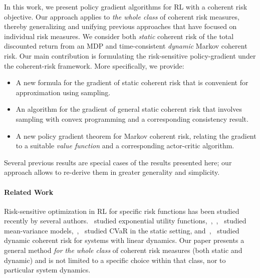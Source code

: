 \documentclass{article} %
\newcommand{\citet}{\cite}
\newcommand{\citep}{\cite}
\begin{document}
In this work, we present policy gradient algorithms for RL with a coherent risk objective. Our approach applies to \emph{the whole class} of coherent risk measures, thereby generalizing and unifying previous approaches that have focused on individual risk measures.  We consider both \emph{static} coherent risk of the total discounted return from an MDP and  time-consistent {\em dynamic} Markov coherent risk.
%
%
Our main contribution is formulating the risk-sensitive policy-gradient under the coherent-risk framework. More specifically, we provide:
\begin{itemize}
\item A new formula for the gradient of static coherent risk that is convenient for approximation using sampling.
\item An algorithm for the gradient of general static coherent risk that involves sampling with convex programming and a corresponding consistency result.
\item A new policy gradient theorem for Markov coherent risk, relating the gradient to a suitable \emph{value function} and a corresponding actor-critic algorithm.
\end{itemize}
Several previous results are special cases of the results presented here; our approach allows to re-derive them in greater generality and simplicity.

\paragraph{Related Work}
Risk-sensitive optimization in RL for specific risk functions has been studied recently by several authors.~\citet{borkar2001sensitivity} studied exponential utility functions,~\citet{moody2001learning},~\citet{tamar2012policy},~\citet{prashanth2013actor} studied mean-variance models,~\citet{chow2014cvar},~\citet{tamar2015optimizing} studied CVaR in the static setting, and~\citet{petrik2012approximate},~\citet{chow_mpc_14} studied dynamic coherent risk for systems with linear dynamics. Our paper presents a general method \emph{for the whole class} of coherent risk measures (both static and dynamic) and is not limited to a specific choice within that class, nor to particular system dynamics.
\end{document}
